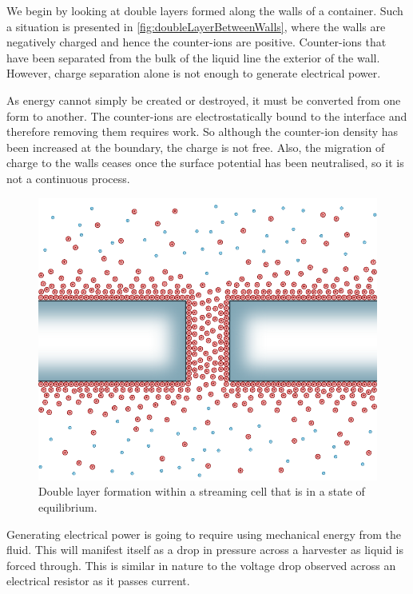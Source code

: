     We begin by looking at double layers formed along the walls of a container.
    Such a situation is presented in \ref{fig:doubleLayerBetweenWalls}, where the walls are negatively charged and hence the counter-ions are positive.
    Counter-ions that have been separated from the bulk of the liquid line the exterior of the wall.
    However, charge separation alone is not enough to generate electrical power.

    As energy cannot simply be created or destroyed, it must be converted from one form to another.
    The counter-ions are electrostatically bound to the interface and therefore removing them requires work.
    So although the counter-ion density has been increased at the boundary, the charge is not free.
    Also, the migration of charge to the walls ceases once the surface potential has been neutralised, so it is not a continuous process.

    \begin{figure}
        \centering
        \includegraphics{content/pt1/01-PowerHarvesting/graphics/intro_2_channel_relaxed}
        \caption{\label{fig:doubleLayerInChannel_noPressure}Double layer formation within a streaming cell that is in a state of equilibrium.}
    \end{figure}

    Generating electrical power is going to require using mechanical energy from the fluid.
    This will manifest itself as a drop in pressure across a harvester as liquid is forced through.
    This is similar in nature to the voltage drop observed across an electrical resistor as it passes current.

